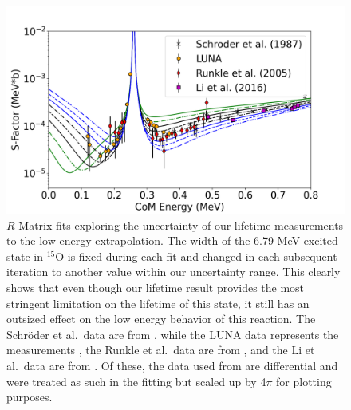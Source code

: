 \begin{figure}[h!]
\includegraphics[width=1.0\linewidth]{./figures/lifetimeEffects.png}
\caption{$R$-Matrix fits exploring the uncertainty of our lifetime measurements to the low energy extrapolation. The width of the 6.79 MeV excited state in $^{15}$O is fixed during each fit and changed in each subsequent iteration to another value within our uncertainty range. This clearly shows that even though our lifetime result provides the most stringent limitation on the lifetime of this state, it still has an outsized effect on the low energy behavior of this reaction. The Schr{\"{o}}der et al.~data are from \cite{Schroder1987}, while the LUNA data represents the measurements \cite{Formicola2004, Imbriani2005, Marta2008, Marta2011}, the Runkle et al.~data are from \cite{Runkle2005}, and the Li et al.~data are from \cite{Li2016}. Of these, the data used from \citet{Li2016} are differential and were treated as such in the fitting but scaled up by 4$\pi$ for plotting purposes.}
\label{fig: rmatrixRange}
\end{figure}


